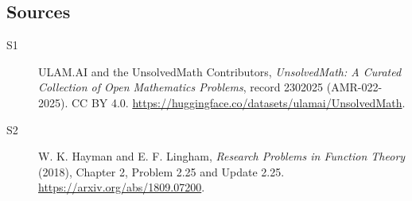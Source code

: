 \documentclass[11pt]{article}
\begin{document}
\subsection{Sources}
\begin{description}
\item[\hypertarget{source:2302025:1}{S1}] ULAM.AI and the UnsolvedMath Contributors, \emph{UnsolvedMath: A Curated Collection of Open Mathematics Problems}, record 2302025 (AMR-022-2025). CC BY 4.0. \url{https://huggingface.co/datasets/ulamai/UnsolvedMath}.
\item[\hypertarget{source:2302025:2}{S2}] W. K. Hayman and E. F. Lingham, \emph{Research Problems in Function Theory} (2018), Chapter 2, Problem 2.25 and Update 2.25. \url{https://arxiv.org/abs/1809.07200}.
\end{description}
\label{end:2302025}
\end{document}
